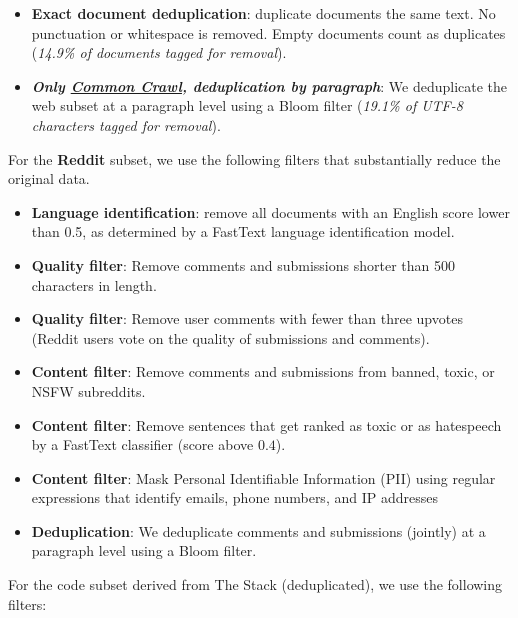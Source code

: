 \begin{itemize}[leftmargin=1em]
    and IP addresses; pages containing 6 or more PIIs are completely removed from the corpus (\textit{0.05\% tagged for masking, 0.11\% tagged for removal}); 
    \item \textbf{Exact document deduplication}: duplicate documents the same text. No punctuation or whitespace is removed. Empty documents count as duplicates (\textit{14.9\% of documents tagged for removal}).
    \item \textbf{\textit{Only \underline{Common Crawl}, deduplication by paragraph}}: We deduplicate the web subset at a paragraph level using a Bloom filter (\textit{19.1\% of UTF-8 characters tagged for removal}).
\end{itemize}


For the \textbf{Reddit} subset, we use the following filters that substantially reduce the original data. 

\begin{itemize}[leftmargin=1em]
    \item \textbf{Language identification}: remove all documents with an English score lower than 0.5, as determined by a FastText language identification model.
    \item \textbf{Quality filter}: Remove comments and submissions shorter than 500 characters in length.
    \item \textbf{Quality filter}: Remove user comments with fewer than three upvotes (Reddit users vote on the quality of submissions and comments).
    \item \textbf{Content filter}: Remove comments and submissions from banned,  toxic, or NSFW subreddits.
    \item \textbf{Content filter}: Remove sentences that get ranked as toxic or as hatespeech by a FastText classifier (score above $0.4$).
    \item  \textbf{Content filter}: Mask Personal Identifiable Information (PII) using regular expressions that identify emails, phone numbers, 
    and IP addresses
    \item \textbf{Deduplication}: We deduplicate comments and submissions (jointly) at a paragraph level using a Bloom filter.
\end{itemize}


For the code subset derived from The Stack (deduplicated), we use the following filters:

